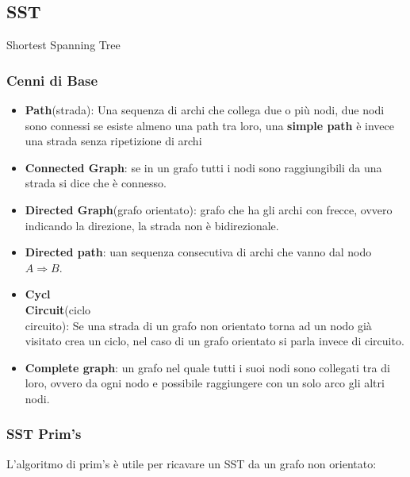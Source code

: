 \documentclass{article}
\begin{document}
\subsection{SST}
Shortest Spanning Tree
\subsubsection{Cenni di Base}
\begin{itemize}
\item \textbf{Path}(strada): Una sequenza di archi che collega due o più nodi, due nodi sono connessi se esiste almeno una path tra loro, una \textbf{simple path} è invece una strada senza ripetizione di archi
\item \textbf{Connected Graph}: se in un grafo tutti i nodi sono raggiungibili da una strada si dice che è connesso.
\item \textbf{Directed Graph}(grafo orientato): grafo che ha gli archi con frecce, ovvero indicando la direzione, la strada non è bidirezionale.
\item \textbf{Directed path}: uan sequenza consecutiva di archi che vanno dal nodo $A \Rightarrow B$.

\item \textbf{Cycl\\Circuit}(ciclo\\circuito): Se una strada di un grafo non orientato torna ad un nodo già visitato crea un ciclo, nel caso di un grafo orientato si parla invece di circuito.

\item \textbf{Complete graph}: un grafo nel quale tutti i suoi nodi sono collegati tra di loro, ovvero da ogni nodo e possibile raggiungere con un solo arco gli altri nodi.

\end{itemize}

\newpage
\subsubsection{SST Prim's}
L'algoritmo di prim's è utile per ricavare un SST da un grafo non orientato:\\
\begin{center}
\end{center}
\end{document}
